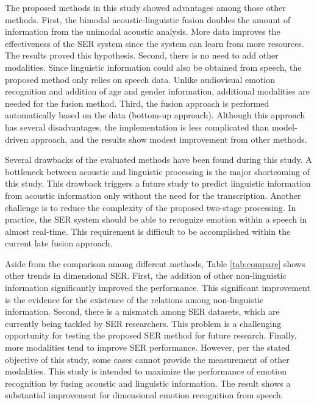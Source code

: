 The proposed methods in this study showed advantages among those other methods.
First, the bimodal acoustic-linguistic fusion doubles the amount of information
from the unimodal acoustic analysis. More data improves the effectiveness of
the SER system since the system can learn from more resources. The results
proved this hypothesis. Second, there is no need to add other modalities. Since
linguistic information could also be obtained from speech, the proposed method
only relies on speech data. Unlike audiovisual emotion recognition and addition
of age and gender information, additional modalities are needed for the fusion
method. Third, the fusion approach is performed automatically based on the data
(bottom-up approach). Although this approach has several disadvantages, the
implementation is less complicated than model-driven approach, and the results
show modest improvement from other methods. 

Several drawbacks of the evaluated methods have been found during this study. A
bottleneck between acoustic and linguistic processing is the major shortcoming
of this study. This drawback triggers a future study to predict linguistic
information from acoustic information only without the need for the
transcription.  Another challenge is to reduce the complexity of the proposed
two-stage processing. In practice, the SER system should be able to recognize
emotion within a speech in almost real-time. This requirement is difficult to
be accomplished within the current late fusion approach.

Aside from the comparison among different methods, Table \ref{tab:compare}
shows other trends in dimensional SER. First, the addition of other
non-linguistic information significantly improved the performance. This
significant improvement is the evidence for the existence of the relations
among non-linguistic information. Second, there is a mismatch among SER
datasets, which are currently being tackled by SER researchers. This problem is
a challenging opportunity for testing the proposed SER method for future
research. Finally, more modalities tend to improve SER performance. However,
per the stated objective of this study, some cases cannot provide the
measurement of other modalities. This study is intended to maximize the
performance of emotion recognition by fusing acoustic and linguistic
information. The result shows a substantial improvement for dimensional emotion
recognition from speech.


